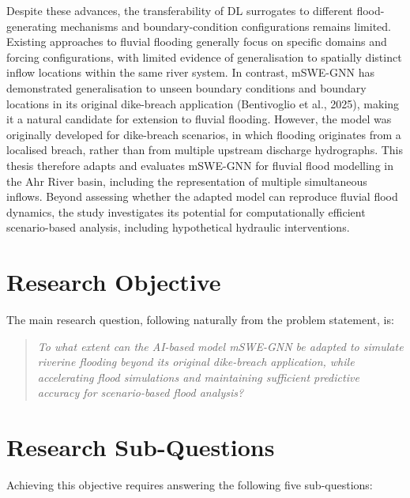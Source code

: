 \documentclass[12pt,a4paper]{report}
\begin{document}
Despite these advances, the transferability of DL surrogates to different flood-generating mechanisms and boundary-condition configurations remains limited. Existing approaches to fluvial flooding generally focus on specific domains and forcing configurations, with limited evidence of generalisation to spatially distinct inflow locations within the same river system. In contrast, mSWE-GNN has demonstrated generalisation to unseen boundary conditions and boundary locations in its original dike-breach application (Bentivoglio et al., 2025), making it a natural candidate for extension to fluvial flooding. However, the model was originally developed for dike-breach scenarios, in which flooding originates from a localised breach, rather than from multiple upstream discharge hydrographs. This thesis therefore adapts and evaluates mSWE-GNN for fluvial flood modelling in the Ahr River basin, including the representation of multiple simultaneous inflows. Beyond assessing whether the adapted model can reproduce fluvial flood dynamics, the study investigates its potential for computationally efficient scenario-based analysis, including hypothetical hydraulic interventions.


\section{Research Objective}

\label{sec:objective}

The main research question, following naturally from the problem statement, is:

\begin{quote}
\emph{To what extent can the AI-based model mSWE-GNN be adapted to simulate riverine flooding beyond its original dike-breach application, while accelerating flood simulations and maintaining sufficient predictive accuracy for scenario-based flood analysis?}
\end{quote}


\section{Research Sub-Questions}

\label{sec:subquestions}

Achieving this objective requires answering the following five sub-questions:
\end{document}
